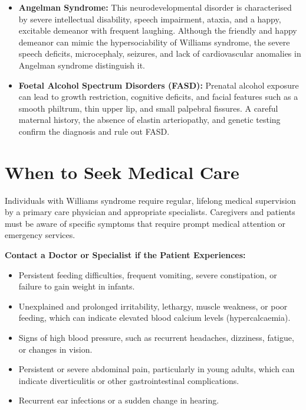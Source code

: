\begin{itemize}
    \item \textbf{Angelman Syndrome:} This neurodevelopmental disorder is characterised by severe intellectual disability, speech impairment, ataxia, and a happy, excitable demeanor with frequent laughing. Although the friendly and happy demeanor can mimic the hypersociability of Williams syndrome, the severe speech deficits, microcephaly, seizures, and lack of cardiovascular anomalies in Angelman syndrome distinguish it.
    \item \textbf{Foetal Alcohol Spectrum Disorders (FASD):} Prenatal alcohol exposure can lead to growth restriction, cognitive deficits, and facial features such as a smooth philtrum, thin upper lip, and small palpebral fissures. A careful maternal history, the absence of elastin arteriopathy, and genetic testing confirm the diagnosis and rule out FASD.
\end{itemize}

\section*{When to Seek Medical Care}
Individuals with Williams syndrome require regular, lifelong medical supervision by a primary care physician and appropriate specialists. Caregivers and patients must be aware of specific symptoms that require prompt medical attention or emergency services.

\textbf{Contact a Doctor or Specialist if the Patient Experiences:}
\begin{itemize}
    \item Persistent feeding difficulties, frequent vomiting, severe constipation, or failure to gain weight in infants.
    \item Unexplained and prolonged irritability, lethargy, muscle weakness, or poor feeding, which can indicate elevated blood calcium levels (hypercalcaemia).
    \item Signs of high blood pressure, such as recurrent headaches, dizziness, fatigue, or changes in vision.
    \item Persistent or severe abdominal pain, particularly in young adults, which can indicate diverticulitis or other gastrointestinal complications.
    \item Recurrent ear infections or a sudden change in hearing.
\end{itemize}

